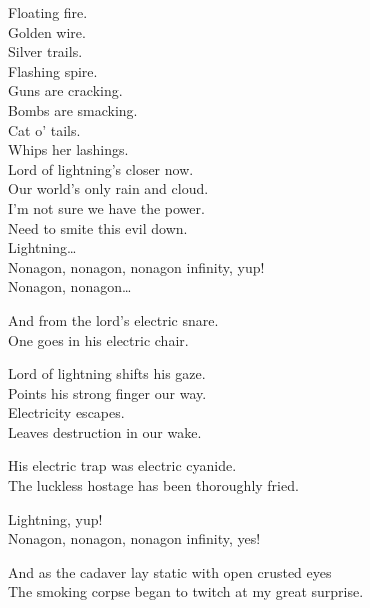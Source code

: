 
Floating fire. \\
Golden wire. \\
Silver trails. \\
Flashing spire. \\

Guns are cracking. \\
Bombs are smacking. \\
Cat o' tails. \\
Whips her lashings. \\

Lord of lightning's closer now. \\
Our world's only rain and cloud. \\
I'm not sure we have the power. \\
Need to smite this evil down. \\

Lightning… \\

Nonagon, nonagon, nonagon infinity, yup! \\
Nonagon, nonagon… \\


And from the lord's electric snare. \\
One goes in his electric chair. \\


Lord of lightning shifts his gaze. \\
Points his strong finger our way. \\
Electricity escapes. \\
Leaves destruction in our wake. \\


His electric trap was electric cyanide. \\
The luckless hostage has been thoroughly fried. \\


Lightning, yup! \\

Nonagon, nonagon, nonagon infinity, yes! \\


And as the cadaver lay static with open crusted eyes \\
The smoking corpse began to twitch at my great surprise. \\

